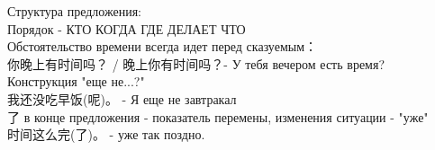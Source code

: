 Структура предложения:\\
Порядок - КТО КОГДА ГДЕ ДЕЛАЕТ ЧТО\\
Обстоятельство времени всегда идет перед сказуемым：\\
你晚上有时间吗？ / 晚上你有时间吗？- У тебя вечером есть время?\\
Конструкция "еще не...?"\\
我还没吃早饭(呢)。 - Я еще не завтракал\\
了 в конце предложения - показатель перемены, изменения ситуации - "уже"\\
时间这么完(了)。 - уже так поздно.\\
